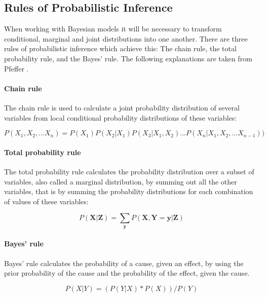 \documentclass{article}
\begin{document}
\pagebreak
\begin{appendices}
\section{Rules of Probabilistic Inference}
\label{appendix:Rules of Probabilistic Inference}

When working with Bayesian models it will be necessary to transform conditional, marginal and joint distributions into one another. There are three rules of probabilistic inference which achieve this: The chain rule, the total probability rule, and the Bayes' rule. The following explanations are taken from Pfeffer \cite{9781617292330}.

\paragraph{Chain rule}

The chain rule is used to calculate a \gls{joint probability distribution} of several variables from local \gls{conditional probability distribution}s of these variables:

\begin{equation}
P(X_1 ,X_2 ,...X_n ) = P(X_1 )P(X_2 | X_1 )P(X_3 | X_1 ,X_2 )...P(X_n | X_1 ,X_2 ,...X_{n-1}) )
\end{equation}

\paragraph{Total probability rule}

The total probability rule calculates the probability distribution over a subset of variables, also called a \gls{marginal distribution}, by summing out all the other variables, that is by summing the probability distributions for each combination of values of these variables:

\begin{equation}
P(\boldsymbol X |\boldsymbol Z ) = \sum_{\boldsymbol y}   P(\boldsymbol X ,\boldsymbol Y =\boldsymbol y |\boldsymbol Z )
\end{equation} 

\paragraph{Bayes' rule}

Bayes' rule calculates the probability of a cause, given an effect, by using the prior probability of the cause and the probability of the effect, given the cause. 

\begin{equation}
P(X|Y) = ( P(Y|X) * P(X) ) / P(Y)
\end{equation}
\end{appendices}
	
\end{document}
